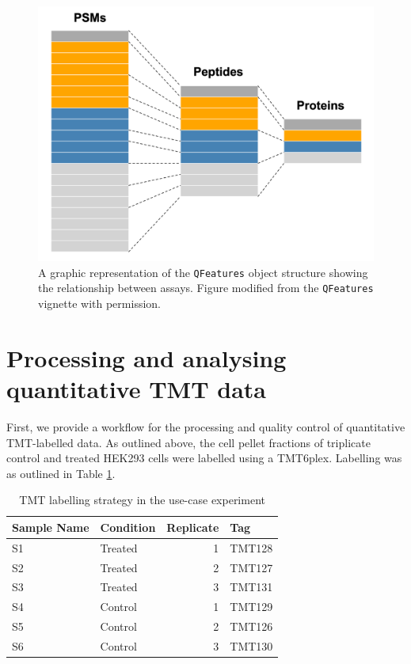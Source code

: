 \documentclass[9pt,a4paper,]{extarticle}
\begin{document}
\begin{figure}

{\centering \includegraphics[width=1\linewidth]{Images/qfeatures} 

}

\caption{A graphic representation of the \texttt{QFeatures} object structure showing the relationship between assays. Figure modified from the \texttt{QFeatures} \citep{QFeat} vignette with permission.}\label{fig:qfeatures}
\end{figure}

\section{Processing and analysing quantitative TMT data}\label{processing-and-analysing-quantitative-tmt-data}

First, we provide a workflow for the processing and quality control of
quantitative TMT-labelled data. As outlined above, the cell pellet fractions of
triplicate control and treated HEK293 cells were labelled using a TMT6plex.
Labelling was as outlined in Table \ref{tab:table1}.

\begin{table}

\caption{\label{tab:table1}TMT labelling strategy in the use-case experiment}
\centering
\begin{tabular}[t]{l|l|r|l}
\hline
Sample Name & Condition & Replicate & Tag\\
\hline
S1 & Treated & 1 & TMT128\\
\hline
S2 & Treated & 2 & TMT127\\
\hline
S3 & Treated & 3 & TMT131\\
\hline
S4 & Control & 1 & TMT129\\
\hline
S5 & Control & 2 & TMT126\\
\hline
S6 & Control & 3 & TMT130\\
\hline
\end{tabular}
\end{table}
\end{document}
